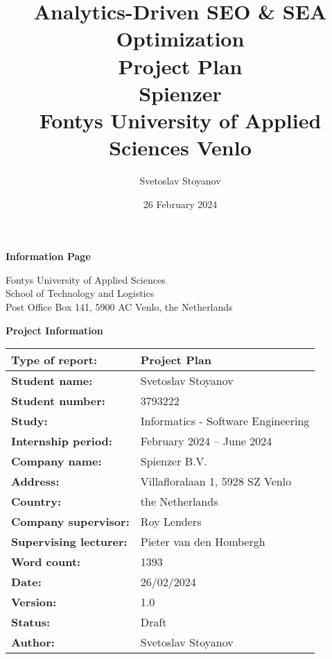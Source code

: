 \documentclass[12pt,a4paper]{article}
\title{
    {\Large Analytics-Driven SEO \& SEA Optimization}\\
    {\large Project Plan}\\[1em]
    {\normalsize \textbf{Spienzer}}\\
    {\normalsize Fontys University of Applied Sciences Venlo}
}
\author{Svetoslav Stoyanov}
\date{26 February 2024}
\begin{document}
\maketitle
\newpage
\thispagestyle{empty} %

\maketitle
\newpage
\thispagestyle{empty} %

\begin{center}
    \Large\textbf{Information Page}


Fontys University of Applied Sciences\\

School of Technology and Logistics\\
Post Office Box 141, 5900 AC Venlo, the Netherlands
\end{center}



\begin{center}
    \Large\textbf{Project Information}

\vspace{1em} %

\begin{tabular}{|l|l|} \hline 
    \textbf{Type of report:} & Project Plan \\ \hline 
    \textbf{Student name:} & Svetoslav Stoyanov \\ \hline 
    \textbf{Student number:} & 3793222 \\ \hline 
    \textbf{Study:} & Informatics - Software Engineering \\ \hline 
    \textbf{Internship period:} & February 2024 – June 2024 \\ \hline 
    \textbf{Company name:} & Spienzer B.V. \\ \hline 
    \textbf{Address:} & Villafloralaan 1, 5928 SZ Venlo \\ \hline 
    \textbf{Country:} & the Netherlands \\ \hline 
    \textbf{Company supervisor:} & Roy Lenders \\ \hline 
    \textbf{Supervising lecturer:} & Pieter van den Hombergh \\ \hline 
    \textbf{Word count:} & 1393 \\ \hline 
    \textbf{Date:} & 26/02/2024 \\ \hline 
    \textbf{Version:} & 1.0 \\ \hline 
    \textbf{Status:} & Draft \\ \hline 
    \textbf{Author:} & Svetoslav Stoyanov \\ \hline
\end{tabular}
\end{center}
\end{document}
